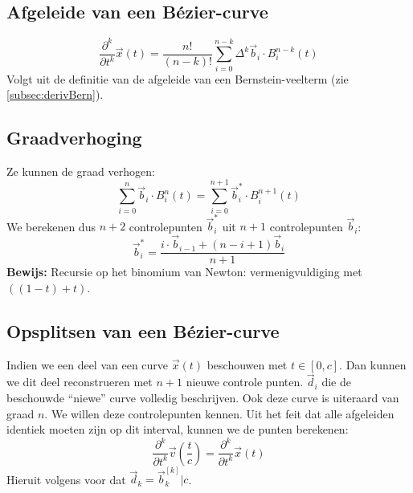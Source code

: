 \documentclass[a4paper,titlepage]{article}
\begin{document}
\subsection{Afgeleide van een B\'ezier-curve}
\label{subsec:derivBezier}
\begin{equation}
\displaystyle\frac{\partial^k}{\partial t^k}\vec{x}\left(t\right)=\displaystyle\frac{n!}{\left(n-k\right)!}\displaystyle\sum_{i=0}^{n-k}{\Delta^k\vec{b}_i\cdot B_i^{n-k}\left(t\right)}
\end{equation}
Volgt uit de definitie van de afgeleide van een Bernstein-veelterm (zie \ref{subsec:derivBern}).
\subsection{Graadverhoging}
Ze kunnen de graad verhogen:
\begin{equation}
\displaystyle\sum_{i=0}^{n}{\vec{b}_i\cdot B_i^n\left(t\right)}=\displaystyle\sum_{i=0}^{n+1}{\vec{b}_i^*\cdot B_i^{n+1}\left(t\right)}
\end{equation}
We berekenen dus $n+2$ controlepunten $\vec{b}_i^*$ uit $n+1$ controlepunten $\vec{b}_i$:
\begin{equation}
\vec{b}_i^*=\displaystyle\frac{i\cdot \vec{b}_{i-1}+\left(n-i+1\right)\vec{b}_i}{n+1}
\end{equation}
\textbf{Bewijs:} Recursie op het binomium van Newton: vermenigvuldiging met $\left(\left(1-t\right)+t\right)$.
\subsection{Opsplitsen van een B\'ezier-curve}
Indien we een deel van een curve $\vec{x}\left(t\right)$ beschouwen met $t\in\left[0,c\right]$. Dan kunnen we dit deel reconstrueren met $n+1$ nieuwe controle punten. $\vec{d}_i$ die de beschouwde ``niewe'' curve volledig beschrijven. Ook deze curve is uiteraard van graad $n$. We willen deze controlepunten kennen.
Uit het feit dat alle afgeleiden identiek moeten zijn op dit interval, kunnen we de punten berekenen:
\begin{equation}
\displaystyle\frac{\partial^k}{\partial t^k}\vec{v}\left(\displaystyle\frac{t}{c}\right)=\displaystyle\frac{\partial^k}{\partial t^k}\vec{x}\left(t\right)
\end{equation}
Hieruit volgens voor dat $\vec{d}_k=\vec{b}_k^{[k]}|c$.
\end{document}
